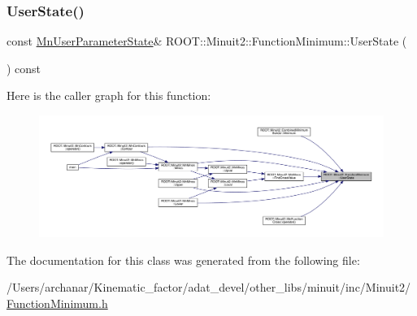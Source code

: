 \mbox{\label{classROOT_1_1Minuit2_1_1FunctionMinimum_a698dc320ec24e2288f391f160ef8213e}} 
\subsubsection{\texorpdfstring{UserState()}{UserState()}\hspace{0.1cm}{\footnotesize\ttfamily [2/2]}}
{\footnotesize\ttfamily const \mbox{\hyperlink{classROOT_1_1Minuit2_1_1MnUserParameterState}{Mn\+User\+Parameter\+State}}\& R\+O\+O\+T\+::\+Minuit2\+::\+Function\+Minimum\+::\+User\+State (\begin{DoxyParamCaption}{ }\end{DoxyParamCaption}) const\hspace{0.3cm}{\ttfamily [inline]}}

Here is the caller graph for this function\+:\nopagebreak
\begin{figure}[H]
\begin{center}
\leavevmode
\includegraphics[width=350pt]{d4/dfb/classROOT_1_1Minuit2_1_1FunctionMinimum_a698dc320ec24e2288f391f160ef8213e_icgraph}
\end{center}
\end{figure}


The documentation for this class was generated from the following file\+:\begin{DoxyCompactItemize}
\item 
/\+Users/archanar/\+Kinematic\+\_\+factor/adat\+\_\+devel/other\+\_\+libs/minuit/inc/\+Minuit2/\mbox{\hyperlink{other__libs_2minuit_2inc_2Minuit2_2FunctionMinimum_8h}{Function\+Minimum.\+h}}\end{DoxyCompactItemize}
